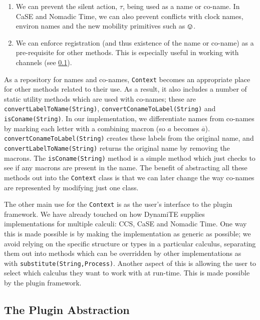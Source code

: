 \begin{enumerate}
\item We can prevent the silent action, $\tau$, being used as a name
  or co-name.  In CaSE and Nomadic Time, we can also prevent conflicts
  with clock names, environ names and the new mobility primitives
  such as $\tntin$.
\item We can enforce registration (and thus existence of the name or
  co-name) as a pre-requisite for other methods.  This is especially
  useful in working with channels (see \ref{dyn:plugin}).
\end{enumerate}

As a repository for names and co-names, \texttt{Context} becomes an
appropriate place for other methods related to their use.  As a
result, it also includes a number of static utility methods which are
used with co-names; these are \texttt{convertLabelToName(String)},
\texttt{convertConameToLabel(String)} and \texttt{isConame(String)}.
In our implementation, we differentiate names from co-names by marking
each letter with a combining macron (so $a$ becomes $\overline{a}$).
\texttt{convertConameToLabel(String)} creates these labels from the
original name, and \texttt{convertLabelToName(String)} returns the
original name by removing the macrons.  The \texttt{isConame(String)}
method is a simple method which just checks to see if any macrons are
present in the name.  The benefit of abstracting all these methods out
into the \texttt{Context} class is that we can later change the way
co-names are represented by modifying just one class.

The other main use for the \texttt{Context} is as the user's interface
to the plugin framework.  We have already touched on how DynamiTE
supplies implementations for multiple calculi: CCS, CaSE and Nomadic
Time.  One way this is made possible is by making the implementation
as generic as possible; we avoid relying on the specific structure or
types in a particular calculus, separating them out into methods which
can be overridden by other implementations as with
\texttt{substitute(String,Process)}.  Another aspect of this is
allowing the user to select which calculus they want to work with at
run-time.  This is made possible by the plugin framework.

\subsection{The Plugin Abstraction}
\label{dyn:plugin}

